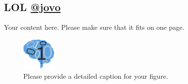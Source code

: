\documentclass[simplex.tex]{subfiles}
\begin{document}
\subsection{LOL \href{https://github.com/jovo}{@jovo}}


Your content here. Please make sure that it fits on one page.

\begin{figure}[!h]
\begin{cframed}
\centering
\includegraphics[width=0.15\textwidth]{neurodata_small.png}
\caption{Please provide a detailed caption for your figure.}
\label{fig:meda}
\end{cframed}
\end{figure}
\end{document}
